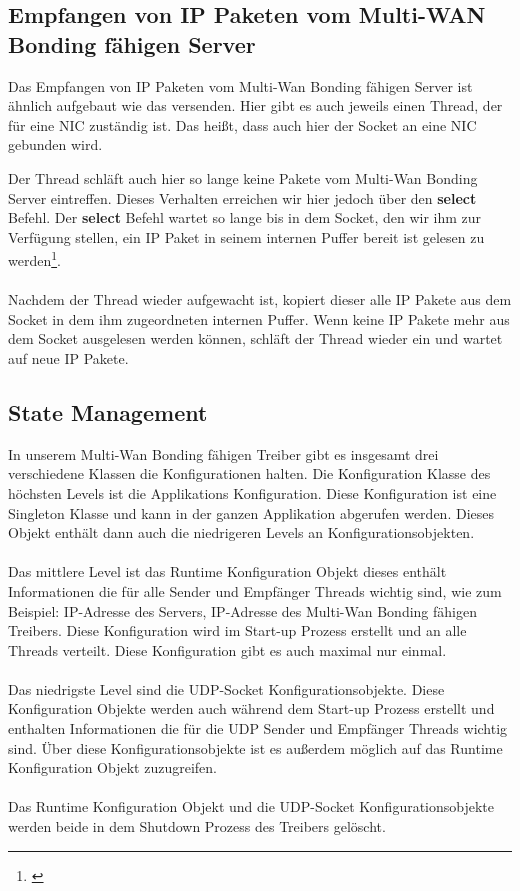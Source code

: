 \subsection{Empfangen von IP Paketen vom Multi-WAN Bonding fähigen Server}
Das Empfangen von IP Paketen vom Multi-Wan Bonding fähigen Server ist ähnlich aufgebaut wie das versenden. Hier gibt es auch jeweils einen Thread, der für eine NIC zuständig ist. Das heißt, dass auch hier der Socket an eine NIC gebunden wird.

\newpage

Der Thread schläft auch hier so lange keine Pakete vom Multi-Wan Bonding Server eintreffen. Dieses Verhalten erreichen wir hier jedoch über den \textbf{select} Befehl. Der \textbf{select} Befehl wartet so lange bis in dem Socket, den wir ihm zur Verfügung stellen, ein IP Paket in seinem internen Puffer bereit ist gelesen zu werden\footnote[1]{\cite[Vgl.][]{18}}. 
\\\\
Nachdem der Thread wieder aufgewacht ist, kopiert dieser alle IP Pakete aus dem Socket in dem ihm zugeordneten internen Puffer. Wenn keine IP Pakete mehr aus dem Socket ausgelesen werden können, schläft der Thread wieder ein und wartet auf neue IP Pakete.
\subsection{State Management}
In unserem Multi-Wan Bonding fähigen Treiber gibt es insgesamt drei verschiedene Klassen die Konfigurationen halten. Die Konfiguration Klasse des höchsten Levels ist die Applikations Konfiguration. Diese Konfiguration ist eine Singleton Klasse und kann in der ganzen Applikation abgerufen werden. Dieses Objekt enthält dann auch die niedrigeren Levels an Konfigurationsobjekten.
\\\\
Das mittlere Level ist das Runtime Konfiguration Objekt dieses enthält Informationen die für alle Sender und Empfänger Threads wichtig sind, wie zum Beispiel: IP-Adresse des Servers, IP-Adresse des Multi-Wan Bonding fähigen Treibers. Diese Konfiguration wird im Start-up Prozess erstellt und an alle Threads verteilt. Diese Konfiguration gibt es auch maximal nur einmal.
\\\\
Das niedrigste Level sind die UDP-Socket Konfigurationsobjekte. Diese Konfiguration Objekte werden auch während dem Start-up Prozess erstellt und enthalten Informationen die für die UDP Sender und Empfänger Threads wichtig sind. Über diese Konfigurationsobjekte ist es außerdem möglich auf das Runtime Konfiguration Objekt zuzugreifen. 
\\\\
Das Runtime Konfiguration Objekt und die UDP-Socket Konfigurationsobjekte werden beide in dem Shutdown Prozess des Treibers gelöscht.
